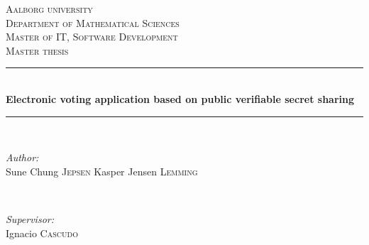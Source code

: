 \documentclass[a4paper]{report}
\theoremstyle{plain}
\begin{document}
\begin{titlepage}

\newcommand{\HRule}{\rule{\linewidth}{0.5mm}} %

\center %
 

\textsc{\LARGE Aalborg university}\\[0.5cm] %
\textsc{\large Department of Mathematical Sciences}\\[1.5cm] %
\textsc{\Large Master of IT, Software Development}\\[0.5cm] %
\textsc{\large Master thesis}\\[0.5cm] %


\HRule \\[0.4cm]
{ \huge \bfseries Electronic voting application based on public verifiable secret sharing}\\[0.4cm] %
\HRule \\[1.5cm]
 

\begin{minipage}{0.4\textwidth}
\begin{flushleft} \large
\emph{Author:}\\
Sune Chung \textsc{Jepsen} %
Kasper Jensen \textsc{Lemming} %
\end{flushleft}
\end{minipage}
~
\begin{minipage}{0.4\textwidth}
\begin{flushright} \large
\emph{Supervisor:} \\
Ignacio \textsc{Cascudo} %
\end{flushright}
\end{minipage}\\[2cm]


\end{titlepage}
\end{document}
